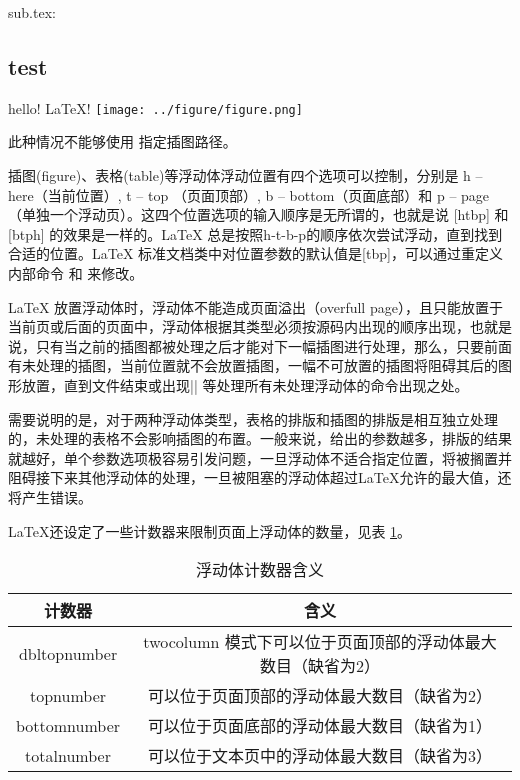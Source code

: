 sub.tex:
\begin{texlist}
\section{test}
hello! \LaTeX{}!
\texttt{[image: ../figure/figure.png]}
\end{texlist}

此种情况不能够使用 指定插图路径。


插图(figure)、表格(table)等浮动体浮动位置有四个选项可以控制，分别是 h --
here（当前位置）, t -- top （页面顶部）, b -- bottom（页面底部）和 p --
page（单独一个浮动页）。这四个位置选项的输入顺序是无所谓的，也就是说
{[}htbp{]} 和 {[}btph{]} 的效果是一样的。LaTeX
总是按照h-t-b-p的顺序依次尝试浮动，直到找到合适的位置。LaTeX
标准文档类中对位置参数的默认值是{[}tbp{]}，可以通过重定义内部命令
 和 来修改。

\begin{texinlist}
\makeatletter
\def\fps@figure{htbp}
\def\fps@table{htbp}
\makeatother
\end{texinlist}

LaTeX 放置浮动体时，浮动体不能造成页面溢出（overfull
page），且只能放置于当前页或后面的页面中，浮动体根据其类型必须按源码内出现的顺序出现，也就是说，只有当之前的插图都被处理之后才能对下一幅插图进行处理，那么，只要前面有未处理的插图，当前位置就不会放置插图，一幅不可放置的插图将阻碍其后的图形放置，直到文件结束或出现|\clearpage| 等处理所有未处理浮动体的命令出现之处。

需要说明的是，对于两种浮动体类型，表格的排版和插图的排版是相互独立处理的，未处理的表格不会影响插图的布置。一般来说，给出的参数越多，排版的结果就越好，单个参数选项极容易引发问题，一旦浮动体不适合指定位置，将被搁置并阻碍接下来其他浮动体的处理，一旦被阻塞的浮动体超过LaTeX允许的最大值，还将产生错误。

LaTeX还设定了一些计数器来限制页面上浮动体的数量，见表 \ref{figure-counter}。

\begin{table}[ht!]
  \centering
  \begin{tabular}{|c|c|}
    \hline
    计数器 & 含义 \\
    \hline
    dbltopnumber & twocolumn 模式下可以位于页面顶部的浮动体最大数目（缺省为2） \\
    \hline
    topnumber & 可以位于页面顶部的浮动体最大数目（缺省为2） \\
    \hline
    bottomnumber & 可以位于页面底部的浮动体最大数目（缺省为1）\\
    \hline
    totalnumber & 可以位于文本页中的浮动体最大数目（缺省为3） \\
    \hline
  \end{tabular}
  \caption{浮动体计数器含义}
  \label{figure-counter}
\end{table}

